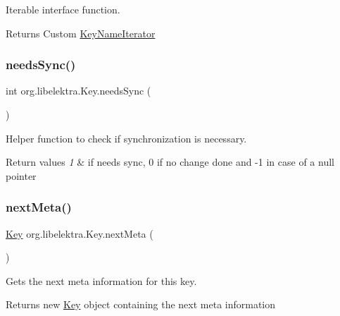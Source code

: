 Iterable interface function. 

\begin{DoxyReturn}{Returns}
Custom \mbox{\hyperlink{classorg_1_1libelektra_1_1KeyNameIterator}{Key\+Name\+Iterator}} 
\end{DoxyReturn}
\mbox{\label{classorg_1_1libelektra_1_1Key_a6f5afab907a28b264af0981e9db58c64}} 
\subsubsection{\texorpdfstring{needsSync()}{needsSync()}}
{\footnotesize\ttfamily int org.\+libelektra.\+Key.\+needs\+Sync (\begin{DoxyParamCaption}{ }\end{DoxyParamCaption})\hspace{0.3cm}{\ttfamily [inline]}}



Helper function to check if synchronization is necessary. 


\begin{DoxyRetVals}{Return values}
{\em 1} & if needs sync, 0 if no change done and -\/1 in case of a null pointer \\
\hline
\end{DoxyRetVals}
\mbox{\label{classorg_1_1libelektra_1_1Key_ace2853c3ca003e9099272871a6d61ad6}} 
\subsubsection{\texorpdfstring{nextMeta()}{nextMeta()}}
{\footnotesize\ttfamily \mbox{\hyperlink{classorg_1_1libelektra_1_1Key}{Key}} org.\+libelektra.\+Key.\+next\+Meta (\begin{DoxyParamCaption}{ }\end{DoxyParamCaption})\hspace{0.3cm}{\ttfamily [inline]}}



Gets the next meta information for this key. 

\begin{DoxyReturn}{Returns}
new \mbox{\hyperlink{classorg_1_1libelektra_1_1Key}{Key}} object containing the next meta information 
\end{DoxyReturn}
\mbox{\label{classorg_1_1libelektra_1_1Key_aea5c4a3a24237dca57e55beca85db0be}} 
